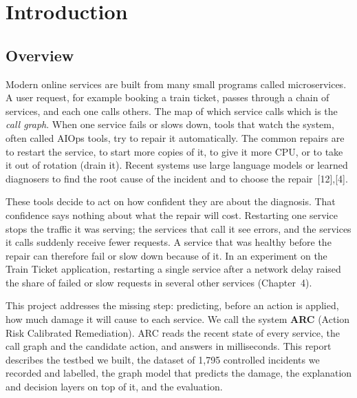\documentclass[12pt,a4paper]{report}
\begin{document}
\tableofcontents
\newpage
\listoffigures
{}
\newpage
\listoftables
{}
\clearpage


\chapter{Introduction}
\section{Overview}
Modern online services are built from many small programs called microservices. A user request, for example booking a train ticket, passes through a chain of services, and each one calls others. The map of which service calls which is the \emph{call graph}. When one service fails or slows down, tools that watch the system, often called AIOps tools, try to repair it automatically. The common repairs are to restart the service, to start more copies of it, to give it more CPU, or to take it out of rotation (drain it). Recent systems use large language models or learned diagnosers to find the root cause of the incident and to choose the repair~[12],[4].

These tools decide to act on how confident they are about the diagnosis. That confidence says nothing about what the repair will cost. Restarting one service stops the traffic it was serving; the services that call it see errors, and the services it calls suddenly receive fewer requests. A service that was healthy before the repair can therefore fail or slow down because of it. In an experiment on the Train Ticket application, restarting a single service after a network delay raised the share of failed or slow requests in several other services (Chapter~4).

This project addresses the missing step: predicting, before an action is applied, how much damage it will cause to each service. We call the system \textbf{ARC} (Action Risk Calibrated Remediation). ARC reads the recent state of every service, the call graph and the candidate action, and answers in milliseconds. This report describes the testbed we built, the dataset of 1,795 controlled incidents we recorded and labelled, the graph model that predicts the damage, the explanation and decision layers on top of it, and the evaluation.
\end{document}
